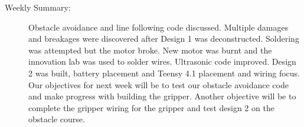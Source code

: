\documentclass[11pt]{report}
\begin{document}
\begin{adjustwidth}{0.5cm}{0cm}
\vspace{0.1em}\begin{description}
    \item [Weekly Summary:] Obstacle avoidance and line following code discussed. Multiple damages and breakages were discovered after Design 1 was deconstructed. Soldering was attempted but the motor broke. New motor was burnt and the innovation lab was used to solder wires. Ultrasonic code improved. Design 2 was built, battery placement and Teensy 4.1 placement and wiring focus. Our objectives for next week will be to test our obstacle avoidance code and make progress with building the gripper. Another objective will be to complete the gripper wiring for the gripper and test design 2 on the obstacle course.
\end{description}\vspace{0.5em}
\end{adjustwidth}
\end{document}
